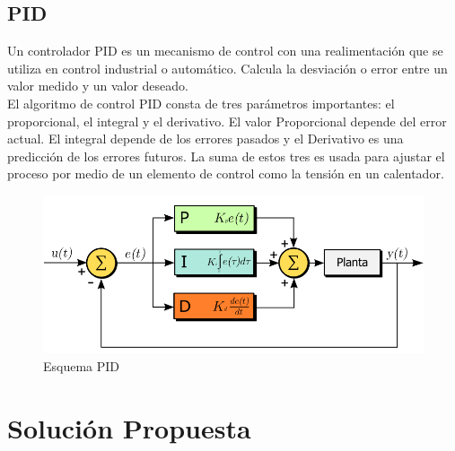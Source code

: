 \documentclass[letterpaper]{article}
\begin{document}
\subsection{PID}
 Un controlador PID es un mecanismo de control con una realimentación que se utiliza en control industrial o automático. Calcula la desviación o error entre un valor medido y un valor deseado.\\
 El algoritmo de control PID consta de tres parámetros importantes: el proporcional, el integral y el derivativo. El valor Proporcional depende del error actual. El integral depende de los errores pasados y el Derivativo es una predicción de los errores futuros. La suma de estos tres es usada para ajustar el proceso por medio de un elemento de control como la tensión en un calentador.\cite{1}\\

\begin{figure}[hbtp]
\centering
\includegraphics[width=10 cm]{PID.png}
\caption{Esquema PID}
\label{PID}
\end{figure}


\newpage
\section{Solución Propuesta}
\end{document}
